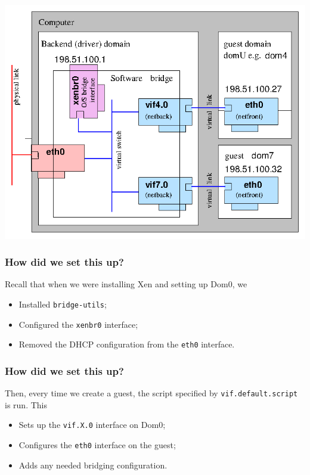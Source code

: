 \documentclass[10pt]{beamer}
\begin{document}
\begin{frame}

    \includegraphics[width=\linewidth]{network-bridge}
\end{frame}


\begin{frame}
  \frametitle{How did we set this up?}
 
 Recall that when we were installing Xen and setting up Dom0, we
 
    \begin{itemize}
    \item Installed \texttt{bridge-utils};
    \item Configured the \texttt{xenbr0} interface;
    \item Removed the DHCP configuration from the \texttt{eth0} interface.
  \end{itemize}
\end{frame}

\begin{frame}
  \frametitle{How did we set this up?}
 
 Then, every time we create a guest, the script specified by 
 \texttt{vif.default.script} is run. This
 
    \begin{itemize}
    \item Sets up the \texttt{vif.X.0} interface on Dom0;
    \item Configures the \texttt{eth0} interface on the guest;
    \item Adds any needed bridging configuration.
  \end{itemize}
\end{frame}
\end{document}
